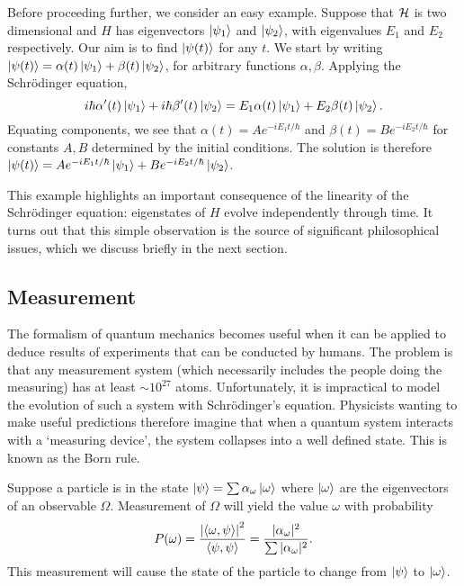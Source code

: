 \documentclass[a4paper]{article}
\begin{document}
Before proceeding further, we consider an easy example. Suppose that $\mathcal{H}$ is two dimensional and $H$ has eigenvectors $\left\lvert \psi_1 \right\rangle$ and $\left\lvert \psi_2 \right\rangle$, with eigenvalues $E_1$ and $E_2$ respectively. Our aim is to find $\left\lvert \psi(t) \right\rangle$ for any $t$. We start by writing $\left\lvert \psi(t) \right\rangle = \alpha(t) \left\lvert \psi_1 \right\rangle + \beta(t) \left\lvert \psi_2 \right\rangle$, for arbitrary functions $\alpha, \beta$. Applying the Schr\"{o}dinger equation, 
$$i\hbar \alpha'(t) \left\lvert \psi_1 \right\rangle + i\hbar \beta'(t) \left\lvert \psi_2 \right\rangle = E_1 \alpha(t) \left\lvert \psi_1 \right\rangle + E_2 \beta(t) \left\lvert \psi_2 \right\rangle.$$
Equating components, we see that $\alpha(t) = Ae^{-iE_1t/\hbar}$ and $\beta(t) = Be^{-iE_2t/\hbar}$ for constants $A, B$ determined by the initial conditions. The solution is therefore $\left\lvert \psi(t) \right\rangle = Ae^{-iE_1t/\hbar}\left\lvert \psi_1 \right\rangle + Be^{-iE_2t/\hbar}\left\lvert \psi_2 \right\rangle$. 

This example highlights an important consequence of the linearity of the Schr\"{o}dinger equation: eigenstates of $H$ evolve independently through time. It turns out that this simple observation is the source of significant philosophical issues, which we discuss briefly in the next section.

\subsection{Measurement}
The formalism of quantum mechanics becomes useful when it can be applied to deduce results of experiments that can be conducted by humans. The problem is that any measurement system (which necessarily includes the people doing the measuring) has at least $\sim 10^{27}$ atoms. Unfortunately, it is impractical to model the evolution of such a system with Schr\"{o}dinger's equation. Physicists wanting to make useful predictions therefore imagine that when a quantum system interacts with a `measuring device', the system collapses into a well defined state. This is known as the Born rule.

\begin{princ}
    Suppose a particle is in the state $\left\lvert \psi \right\rangle = \sum \alpha_\omega \left\lvert \omega \right\rangle$ where $\left\lvert \omega \right\rangle$ are the eigenvectors of an observable $\Omega$. Measurement of $\Omega$ will yield the value $\omega$ with probability $$P(\omega) = \frac{\left\lvert \left\langle \omega , \psi \right\rangle \right\rvert^2}{\left\langle \psi , \psi \right\rangle} = \frac{|\alpha_\omega|^2}{\sum |\alpha_\omega|^2}.$$ This measurement will cause the state of the particle to change from $\left\lvert \psi \right\rangle$ to $\left\lvert \omega \right\rangle$.
\end{princ}
\end{document}
